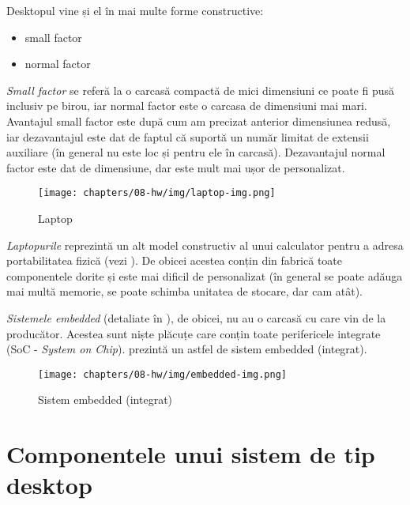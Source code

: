 Desktopul vine și el în mai multe forme constructive:

\begin{itemize}
	\item small factor
	\item normal factor
\end{itemize}

\textit{Small factor} se referă la o carcasă compactă de mici dimensiuni ce
poate fi pusă inclusiv pe birou, iar normal factor este o carcasa de dimensiuni
mai mari. Avantajul small factor este după cum am precizat anterior
dimensiunea redusă, iar dezavantajul este dat de faptul că suportă un număr
limitat de extensii auxiliare (în general nu este loc și pentru ele în carcasă).
Dezavantajul normal factor este dat de dimensiune, dar este mult mai ușor de
personalizat.

\begin{figure}[!htbp]
	\centering
	\texttt{[image: chapters/08-hw/img/laptop-img.png]}
	\caption{Laptop\protect\footnotemark}
	\label{fig:hw:laptop}
\end{figure}


\textit{Laptopurile} reprezintă un alt model constructiv al unui calculator
pentru a adresa portabilitatea fizică (vezi ). De
obicei acestea conțin din fabrică toate componentele dorite și este mai dificil
de personalizat (în general se poate adăuga mai multă memorie, se poate schimba
unitatea de stocare, dar cam atât).

\textit{Sistemele embedded} (detaliate în ), de obicei,
nu au o carcasă cu care vin de la producător. Acestea sunt niște plăcuțe care
conțin toate perifericele integrate (SoC - \textit{System on Chip}).
 prezintă un astfel de sistem embedded
(integrat).

\begin{figure}[!htbp]
	\centering
	\texttt{[image: chapters/08-hw/img/embedded-img.png]}
	\caption{Sistem embedded (integrat)\protect\footnotemark}
	\label{fig:hw:embed}
\end{figure}


\section{Componentele unui sistem de tip desktop}
\label{sec:hw:components}

